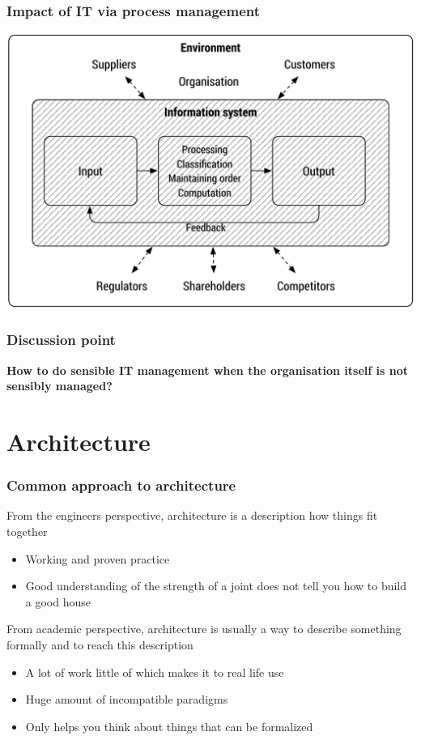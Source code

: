 \begin{frame}[fragile]
  \frametitle{Impact of IT via process management}
		\begin{center}
			\includegraphics[width=.80\textwidth]{info_org.pdf}\\
		\end{center}
		\cite{laudon2000management}
\end{frame}


\begin{frame}[fragile]
  \frametitle{Discussion point}
		\begin{center}
			\textbf{How to do sensible IT management when the organisation itself is not sensibly managed?}
		\end{center}
\end{frame}

\section{Architecture}

\begin{frame}[fragile]
  \frametitle{Common approach to architecture}
		From the engineers perspective, architecture is a description how things fit together
		\begin{itemize}
			\item Working and proven practice
			\item Good understanding of the strength of a joint does not tell you how to build a good house
		\end{itemize}
		
		From academic perspective, architecture is usually a way to describe something formally and to reach this description
		\begin{itemize}
			\item A lot of work little of which makes it to real life use
			\item Huge amount of incompatible paradigms
			\item Only helps you think about things that can be formalized
		\end{itemize}
		
\end{frame}

